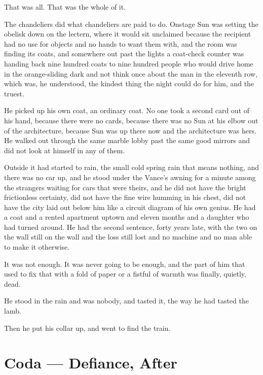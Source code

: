 \documentclass[11pt,openany]{book}
\begin{document}
That was all. That was the whole of it.

The chandeliers did what chandeliers are paid to do. Onstage Sun was setting the obelisk down on the lectern, where it would sit unclaimed because the recipient had no use for objects and no hands to want them with, and the room was finding its coats, and somewhere out past the lights a coat-check counter was handing back nine hundred coats to nine hundred people who would drive home in the orange-sliding dark and not think once about the man in the eleventh row, which was, he understood, the kindest thing the night could do for him, and the truest.

He picked up his own coat, an ordinary coat. No one took a second card out of his hand, because there were no cards, because there was no Sun at his elbow out of the architecture, because Sun was up there now and the architecture was hers. He walked out through the same marble lobby past the same good mirrors and did not look at himself in any of them.

Outside it had started to rain, the small cold spring rain that means nothing, and there was no car up, and he stood under the Vance's awning for a minute among the strangers waiting for cars that were theirs, and he did not have the bright frictionless certainty, did not have the fine wire humming in his chest, did not have the city laid out below him like a circuit diagram of his own genius. He had a coat and a rented apartment uptown and eleven months and a daughter who had turned around. He had the second sentence, forty years late, with the two on the wall still on the wall and the loss still lost and no machine and no man able to make it otherwise.

It was not enough. It was never going to be enough, and the part of him that used to fix that with a fold of paper or a fistful of warmth was finally, quietly, dead.

He stood in the rain and was nobody, and tasted it, the way he had tasted the lamb.

Then he put his collar up, and went to find the train.

\clearpage
\chapter*{Coda — Defiance, After}
\end{document}
